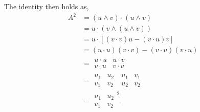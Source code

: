 \documentclass[12pt]{article}
\begin{document}
 The identity then holds as, 
\begin{align*}
    A^2 &= (u \wedge v) \cdot (u \wedge v)\\
    &= u \cdot (v \wedge (u \wedge v))\\
    &= u \cdot [(v \cdot v)u - (v \cdot u)v]\\
    &= (u \cdot u)(v \cdot v) - (v \cdot u)(v \cdot u)\\
    &= \begin{array}{|cc|}
    u \cdot u & u \cdot v\\
    v \cdot u & v \cdot v
    \end{array}\\
    &= \begin{array}{|cc|}
    u_1 & u_2\\
    v_1 & v_2
    \end{array}~
    \begin{array}{|cc|}
    u_1 & v_1\\
    u_2 & v_2
    \end{array}\\
    &=\begin{array}{|cc|}
    u_1 & u_2\\
    v_1 & v_2
    \end{array}^2.
\end{align*}
\end{document}
